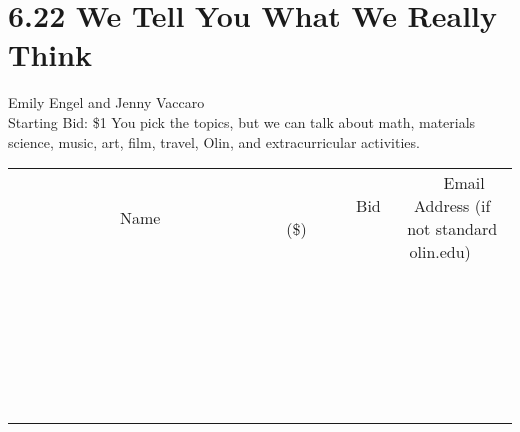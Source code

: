 \documentclass[11pt]{article}
\begin{document}
\section*{6.22 We Tell You What We Really Think}
Emily Engel and Jenny Vaccaro
\\
Starting Bid: \$1
\newline
You pick the topics, but we can talk about math, materials science, music, art, film, travel, Olin, and extracurricular activities.
\\[6ex]
\begin{tabular}{c c c}
~~~~~~~~~~~~~Name~~~~~~~~~~~~~ & ~~~~~~~~~Bid (\$)~~~~~~~~~  & ~~~Email Address (if not standard olin.edu)~~~\\
 & & \\
\hline
 & & \\
\hline
 & & \\
\hline
 & & \\
\hline
 & & \\
\hline
 & & \\
\hline
 & & \\
\hline
 & & \\
\hline
 & & \\
\hline
 & & \\
\hline
 & & \\
\hline
 & & \\
\hline
 & & \\
\hline
 & & \\
\hline
 & & \\
\hline
 & & \\
\hline
 & & \\
\hline
 & & \\
\hline
 & & \\
\hline
 & & \\
\hline
 & & \\
\hline
 & & \\
\hline
 & & \\
\hline
 & & \\
\hline
 & & \\
\hline
 & & \\
\hline
\end{tabular}
\newpage
\end{document}
